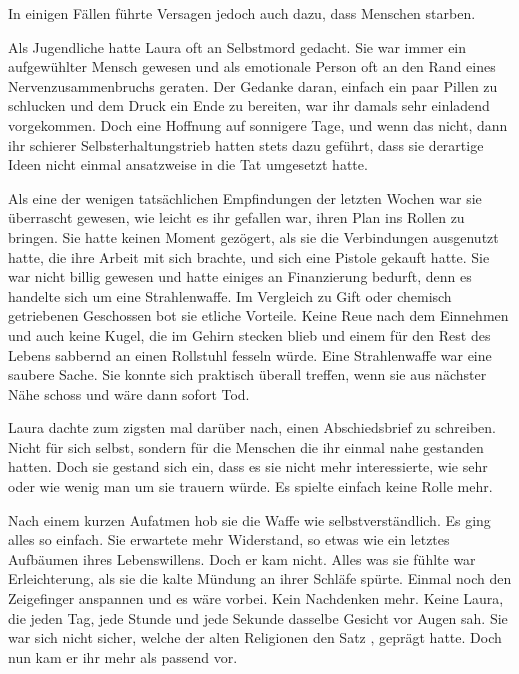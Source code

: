 \par

In einigen Fällen führte Versagen jedoch auch dazu, dass Menschen starben.

\par

Als Jugendliche hatte Laura oft an Selbstmord gedacht. Sie war immer ein aufgewühlter Mensch gewesen und als emotionale Person oft an den Rand eines Nervenzusammenbruchs geraten. Der Gedanke daran, einfach ein paar Pillen zu schlucken und dem Druck ein Ende zu bereiten, war ihr damals sehr einladend vorgekommen. Doch eine Hoffnung auf sonnigere Tage, und wenn das nicht, dann ihr schierer Selbsterhaltungstrieb hatten stets dazu geführt, dass sie derartige Ideen nicht einmal ansatzweise in die Tat umgesetzt hatte.

\par

Als eine der wenigen tatsächlichen Empfindungen der letzten Wochen war sie überrascht gewesen, wie leicht es ihr gefallen war, ihren Plan ins Rollen zu bringen. Sie hatte keinen Moment gezögert, als sie die Verbindungen ausgenutzt hatte, die ihre Arbeit mit sich brachte, und sich eine Pistole gekauft hatte. Sie war nicht billig gewesen und hatte einiges an Finanzierung bedurft, denn es handelte sich um eine Strahlenwaffe. Im Vergleich zu Gift oder chemisch getriebenen Geschossen bot sie etliche Vorteile. Keine Reue nach dem Einnehmen und auch keine Kugel, die im Gehirn stecken blieb und einem für den Rest des Lebens sabbernd an einen Rollstuhl fesseln würde. Eine Strahlenwaffe war eine saubere Sache. Sie konnte sich praktisch überall treffen, wenn sie aus nächster Nähe schoss und wäre dann sofort Tod.

\par

Laura dachte zum zigsten mal darüber nach, einen Abschiedsbrief zu schreiben. Nicht für sich selbst, sondern für die Menschen die ihr einmal nahe gestanden hatten. Doch sie gestand sich ein, dass es sie nicht mehr interessierte, wie sehr oder wie wenig man um sie trauern würde. Es spielte einfach keine Rolle mehr.

\par

Nach einem kurzen Aufatmen hob sie die Waffe wie selbstverständlich. Es ging alles so einfach. Sie erwartete mehr Widerstand, so etwas wie ein letztes Aufbäumen ihres Lebenswillens. Doch er kam nicht. Alles was sie fühlte war Erleichterung, als sie die kalte Mündung an ihrer Schläfe spürte. Einmal noch den Zeigefinger anspannen und es wäre vorbei. Kein Nachdenken mehr. Keine Laura, die jeden Tag, jede Stunde und jede Sekunde dasselbe Gesicht vor Augen sah. Sie war sich nicht sicher, welche der alten Religionen den Satz , geprägt hatte. Doch nun kam er ihr mehr als passend vor.

